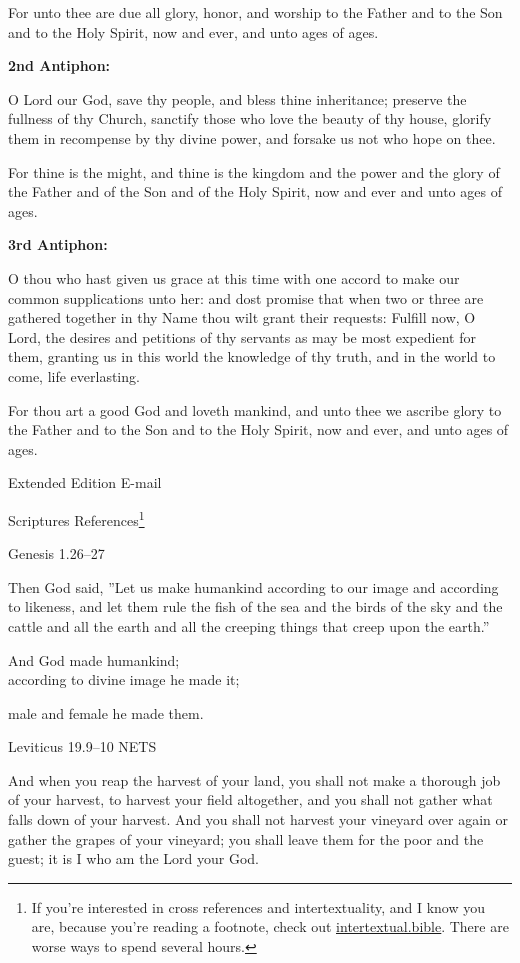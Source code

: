 \documentclass[
]{article}
\newcommand{\RL}[1]{\beginR #1\endR}
\begin{document}
For unto thee are due all glory, honor, and worship to the Father and to
the Son and to the Holy Spirit, now and ever, and unto ages of ages.

\textbf{2nd Antiphon:}

O Lord our God, save thy people, and bless thine inheritance; preserve
the fullness of thy Church, sanctify those who love the beauty of thy
house, glorify them in recompense by thy divine power, and forsake us
not who hope on thee.

For thine is the might, and thine is the kingdom and the power and the
glory of the Father and of the Son and of the Holy Spirit, now and ever
and unto ages of ages.

\textbf{3rd Antiphon:}

O thou who hast given us grace at this time with one accord to make our
common supplications unto her: and dost promise that when two or three
are gathered together in thy Name thou wilt grant their requests:
Fulfill now, O Lord, the desires and petitions of thy servants as may be
most expedient for them, granting us in this world the knowledge of thy
truth, and in the world to come, life everlasting.

For thou art a good God and loveth mankind, and unto thee we ascribe
glory to the Father and to the Son and to the Holy Spirit, now and ever,
and unto ages of ages.

Extended Edition E-mail

Scriptures References\footnote{If you're interested in cross references
  and intertextuality, and I know you are, because you're reading a
  footnote, check out
  \href{http://intertextual.bible}{\ul{intertextual.bible}}. There are
  worse ways to spend several hours.}

Genesis 1.26--27

Then God said, \RL{''}Let us make humankind according to our image and
according to likeness, and let them rule the fish of the sea and the
birds of the sky and the cattle and all the earth and all the creeping
things that creep upon the earth.''

And God made humankind;\\
according to divine image he made it;

male and female he made them.

Leviticus 19.9--10 NETS

And when you reap the harvest of your land, you shall not make a
thorough job of your harvest, to harvest your field altogether, and you
shall not gather what falls down of your harvest. And you shall not
harvest your vineyard over again or gather the grapes of your vineyard;
you shall leave them for the poor and the guest; it is I who am the Lord
your God.
\end{document}
